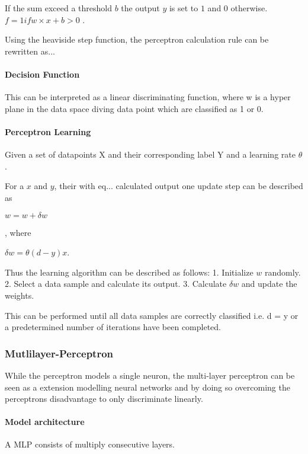 If the sum exceed a threshold $b$ the output $y$ is set to $1$ and $0$ otherwise.
$f = 1 if w \times x + b > 0 $ .

Using the heaviside step function, the perceptron calculation rule can be rewritten as...  

\paragraph{Decision Function}

This can be interpreted as a linear discriminating function, where w is a hyper plane in the data space diving data point which are classified as 1 or 0.

\paragraph{Perceptron Learning}

Given a set of datapoints X and their corresponding label Y and a learning rate $\theta$. 

For a $x$ and $y$, their with eq... calculated output one update step can be described as
 
$w = w + \delta w$

, where 

$\delta w = \theta (d-y) x $.

Thus the learning algorithm can be described as follows:
1. Initialize $w$ randomly.
2. Select a data sample and calculate its output.
3. Calculate $\delta w$ and update the weights.

This can be performed until all data samples are correctly classified i.e. d = y or a predetermined number of iterations have been completed. 


\subsubsection{Mutlilayer-Perceptron}

While the perceptron models a single neuron, the multi-layer perceptron can be seen as a extension modelling neural networks and by doing so overcoming the perceptrons disadvantage to only discriminate linearly. 

\paragraph{Model architecture}

A MLP consists of multiply consecutive layers.

